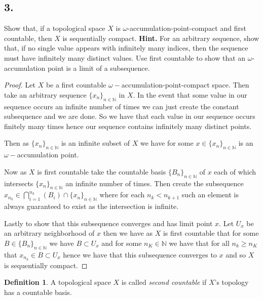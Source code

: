 \documentclass{amsart}
\theoremstyle{plain}
\theoremstyle{definition}
\newtheorem{definition}[theorem]{Definition}
\theoremstyle{remark}
\begin{document}
\vspace{.15in}
\noindent
\subsection*{3.} Show that, if a topological space $X$ is $\omega$-accumulation-point-compact and first countable, then $X$ is sequentially compact. {\bfseries Hint.} For an arbitrary sequence, show that, if no single value appears with infinitely many indices, then the sequence must have infinitely many distinct values. Use first countable to show that an $\omega$-accumulation point is a limit of a subsequence. 


\begin{proof}
    Let $X$ be a first countable $\omega-$accumulation-point-compact space. Then take an arbitrary sequence $\{x_n\}_{n\in \mathbb{N}}$ in $X$. In the event that some value in our sequence occurs an infinite number of times we can just create the constant subsequence and we are done. So we have that each value in our sequence occurs finitely many times hence our sequence contains infinitely many distinct points. 

    Then as $\{x_n\}_{n\in \mathbb{N}}$ is an infinite subset of $X$ we have for some $x \in \{x_n\}_{n\in \mathbb{N}}$ is an $\omega-$accumulation point. 
    
    Now as $X$ is first countable take the countable basis $\{B_n\}_{n\in \mathbb{N}}$ of $x$ each of which intersects $\{x_n\}_{n\in \mathbb{N}}$ an infinite number of times. Then create the subsequence $x_{n_k}\in \bigcap_{i=1}^{n_k} (B_i ) \cap \{x_n\}_{n\in \mathbb{N}}$ where for each $n_k<n_{k+1}$ such an element is always guaranteed to exist as the intersection is infinite. 
    
    Lastly to show that this subsequence converges and has limit point $x$. Let $U_x$ be an arbitrary neighborhood of $x$ then we have as $X$ is first countable that for some $B\in \{B_n\}_{n\in \mathbb N}$  we have $B\subset U_x$ and for some $n_K\in \mathbb{N}$ we have that for all $n_k \geq n_K$ that $x_{n_k} \in B\subset U_x$ hence we have that this subsequence converges to $x$ and so $X$ is sequentially compact.

    
\end{proof}

\vspace{.15in}
\begin{definition} A topological space $X$ is called {\it second countable} if $X$'s topology has a countable basis. \end{definition}
\end{document}
